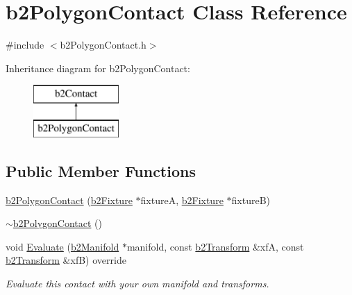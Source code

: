 \hypertarget{classb2_polygon_contact}{}\section{b2\+Polygon\+Contact Class Reference}
\label{classb2_polygon_contact}


{\ttfamily \#include $<$b2\+Polygon\+Contact.\+h$>$}

Inheritance diagram for b2\+Polygon\+Contact\+:\begin{figure}[H]
\begin{center}
\leavevmode
\includegraphics[height=2.000000cm]{classb2_polygon_contact}
\end{center}
\end{figure}
\subsection*{Public Member Functions}
\begin{DoxyCompactItemize}
\item 
\mbox{\hyperlink{classb2_polygon_contact_a93cabf086e75ae40dcd1881760c71c63}{b2\+Polygon\+Contact}} (\mbox{\hyperlink{classb2_fixture}{b2\+Fixture}} $\ast$fixtureA, \mbox{\hyperlink{classb2_fixture}{b2\+Fixture}} $\ast$fixtureB)
\item 
\mbox{\hyperlink{classb2_polygon_contact_a438093c76d08fc66459eeac9c35807db}{$\sim$b2\+Polygon\+Contact}} ()
\item 
void \mbox{\hyperlink{classb2_polygon_contact_aa9581ba4a2bc769b80e3f107801d0950}{Evaluate}} (\mbox{\hyperlink{structb2_manifold}{b2\+Manifold}} $\ast$manifold, const \mbox{\hyperlink{structb2_transform}{b2\+Transform}} \&xfA, const \mbox{\hyperlink{structb2_transform}{b2\+Transform}} \&xfB) override
\begin{DoxyCompactList}\small\item\em Evaluate this contact with your own manifold and transforms. \end{DoxyCompactList}\end{DoxyCompactItemize}
